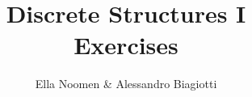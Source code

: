 \documentclass{article}
\title{Discrete Structures I \\ Exercises}
\author{Ella Noomen \& Alessandro Biagiotti}
\date{}
\begin{document}
\maketitle
\clearpage{}
\tableofcontents




























\end{document}
